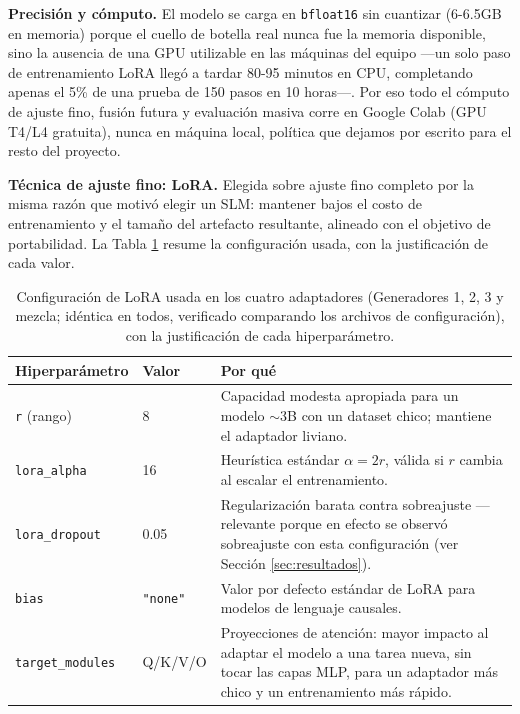 \documentclass[11pt,a4paper]{article}
\begin{document}
\textbf{Precisión y cómputo.} El modelo se carga en \texttt{bfloat16} sin cuantizar (6-6.5GB en memoria) porque el cuello de botella real nunca fue la memoria disponible, sino la ausencia de una GPU utilizable en las máquinas del equipo —un solo paso de entrenamiento LoRA llegó a tardar 80-95 minutos en CPU, completando apenas el 5\% de una prueba de 150 pasos en 10 horas—. Por eso todo el cómputo de ajuste fino, fusión futura y evaluación masiva corre en Google Colab (GPU T4/L4 gratuita), nunca en máquina local, política que dejamos por escrito para el resto del proyecto.

\textbf{Técnica de ajuste fino: LoRA.} Elegida sobre ajuste fino completo por la misma razón que motivó elegir un SLM: mantener bajos el costo de entrenamiento y el tamaño del artefacto resultante, alineado con el objetivo de portabilidad. La Tabla \ref{tab:lora} resume la configuración usada, con la justificación de cada valor.

\begin{table}[h]
\centering
\small
\begin{tabular}{p{3.3cm}p{1.8cm}p{7.9cm}}
\toprule
\textbf{Hiperparámetro} & \textbf{Valor} & \textbf{Por qué} \\
\midrule
\texttt{r} (rango) & 8 & Capacidad modesta apropiada para un modelo $\sim$3B con un dataset chico; mantiene el adaptador liviano. \\
\addlinespace
\texttt{lora\_alpha} & 16 & Heurística estándar $\alpha = 2r$, válida si $r$ cambia al escalar el entrenamiento. \\
\addlinespace
\texttt{lora\_dropout} & 0.05 & Regularización barata contra sobreajuste —relevante porque en efecto se observó sobreajuste con esta configuración (ver Sección \ref{sec:resultados}). \\
\addlinespace
\texttt{bias} & \texttt{"none"} & Valor por defecto estándar de LoRA para modelos de lenguaje causales. \\
\addlinespace
\texttt{target\_modules} & Q/K/V/O & Proyecciones de atención: mayor impacto al adaptar el modelo a una tarea nueva, sin tocar las capas MLP, para un adaptador más chico y un entrenamiento más rápido. \\
\bottomrule
\end{tabular}
\caption{Configuración de LoRA usada en los cuatro adaptadores (Generadores 1, 2, 3 y mezcla; idéntica en todos, verificado comparando los archivos de configuración), con la justificación de cada hiperparámetro.}
\label{tab:lora}
\end{table}
\end{document}
